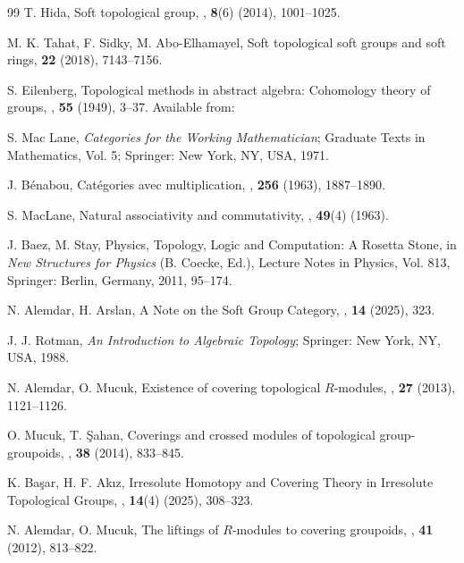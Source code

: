 \documentclass[preprint,12pt]{elsarticle}
\begin{document}
\begin{thebibliography}{99}
T. Hida, Soft topological group,
,
\newblock \textbf{8}(6) (2014), 1001--1025.


M. K. Tahat, F. Sidky, M. Abo-Elhamayel, Soft topological soft groups and soft rings,
\newblock \textbf{22} (2018), 7143--7156.

S. Eilenberg, Topological methods in abstract algebra: Cohomology theory of groups,
,
\newblock \textbf{55} (1949), 3--37.
\newblock Available from:

S. Mac Lane, {\em Categories for the Working Mathematician};
\newblock Graduate Texts in Mathematics, Vol. 5; Springer: New York, NY, USA, 1971.

J. B\'{e}nabou, Cat\'{e}gories avec multiplication,
,
\newblock \textbf{256} (1963), 1887--1890.

S. MacLane, Natural associativity and commutativity,
,
\newblock \textbf{49}(4) (1963).



J. Baez, M. Stay, Physics, Topology, Logic and Computation: A Rosetta Stone, in {\it New Structures for Physics} (B. Coecke, Ed.),
\newblock Lecture Notes in Physics, Vol. 813, Springer: Berlin, Germany, 2011, 95--174.

N. Alemdar, H. Arslan, A Note on the Soft Group Category,
,
\newblock \textbf{14} (2025), 323.

J. J. Rotman, {\em An Introduction to Algebraic Topology};
\newblock Springer: New York, NY, USA, 1988.


N. Alemdar, O. Mucuk, Existence of covering topological $R$-modules,
,
\newblock \textbf{27} (2013), 1121--1126.

O. Mucuk, T. \c{S}ahan, Coverings and crossed modules of topological group-groupoids,
,
\newblock \textbf{38} (2014), 833--845.

K. Ba\c{s}ar, H. F. Ak{\i}z, Irresolute Homotopy and Covering Theory in Irresolute Topological Groups,
,
\newblock \textbf{14}(4) (2025), 308--323.

N. Alemdar, O. Mucuk, The liftings of $R$-modules to covering groupoids,
,
\newblock \textbf{41} (2012), 813--822.


\end{thebibliography}
\end{document}
